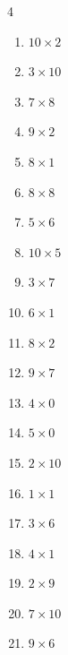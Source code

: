 \begin{multicols}{4}
\begin{enumerate}
  \item $10\times 2$
        \phantom{$=20$}

  \item $3\times 10$
        \phantom{$=30$}

  \item $7\times 8$
        \phantom{$=56$}

  \item $9\times 2$
        \phantom{$=18$}

\columnbreak %

  \item $8\times 1$
        \phantom{$=8$}

  \item $8\times 8$
        \phantom{$=64$}

  \item $5\times 6$
        \phantom{$=30$}

  \item $10\times 5$
        \phantom{$=50$}

  \item $3\times 7$
        \phantom{$=21$}

  \item $6\times 1$
        \phantom{$=6$}

  \item $8\times 2$
        \phantom{$=16$}

  \item $9\times 7$
        \phantom{$=63$}

  \item $4\times 0$
        \phantom{$=0$}

  \item $5\times 0$
        \phantom{$=0$}

  \item $2\times 10$
        \phantom{$=20$}

  \item $1\times 1$
        \phantom{$=1$}

  \item $3\times 6$
        \phantom{$=18$}

  \item $4\times 1$
        \phantom{$=4$}

  \item $2\times 9$
        \phantom{$=18$}

  \item $7\times 10$
        \phantom{$=70$}

  \item $9\times 6$
        \phantom{$=54$}


\end{enumerate}
\end{multicols}
